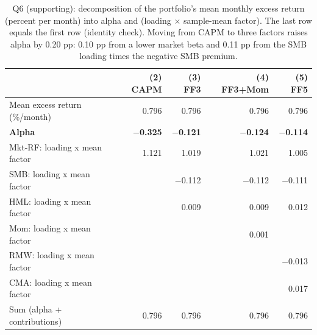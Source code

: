 \begin{table}[!htbp]
\centering
\small
\caption{Q6 (supporting): decomposition of the portfolio's mean monthly excess return (percent per month) into alpha and (loading $\times$ sample-mean factor). The last row equals the first row (identity check). Moving from CAPM to three factors raises alpha by 0.20 pp: 0.10 pp from a lower market beta and 0.11 pp from the SMB loading times the negative SMB premium.}
\label{tab:q6c}
\begin{tabular}{lrrrr}
\toprule
 & (2) CAPM & (3) FF3 & (4) FF3+Mom & (5) FF5 \\
\midrule
Mean excess return (\%/month) & 0.796 & 0.796 & 0.796 & 0.796 \\
\rowcolor[gray]{0.94} \textbf{Alpha} & \textbf{$-$0.325} & \textbf{$-$0.121} & \textbf{$-$0.124} & \textbf{$-$0.114} \\
\addlinespace
Mkt-RF: loading x mean factor & 1.121 & 1.019 & 1.021 & 1.005 \\
SMB: loading x mean factor &  & $-$0.112 & $-$0.112 & $-$0.111 \\
HML: loading x mean factor &  & 0.009 & 0.009 & 0.012 \\
Mom: loading x mean factor &  &  & 0.001 &  \\
RMW: loading x mean factor &  &  &  & $-$0.013 \\
CMA: loading x mean factor &  &  &  & 0.017 \\
\midrule
Sum (alpha + contributions) & 0.796 & 0.796 & 0.796 & 0.796 \\
\bottomrule
\end{tabular}
\end{table}
